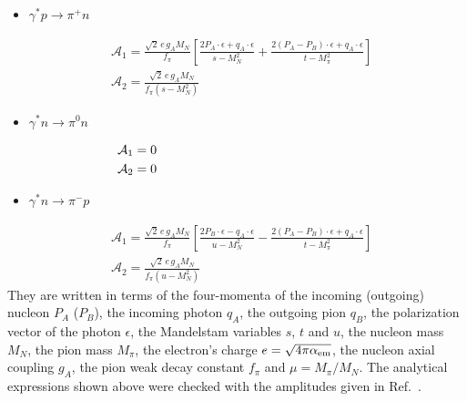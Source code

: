 \documentclass[twocolumn,prc,showpacs,nofootinbib,preprintnumbers,amsmath,amssymb,superscriptaddress]{revtex4-1}
\begin{document}
\begin{itemize}
 \item $\gamma^* p \to \pi^+ n$
\end{itemize}
\begin{align}
  &\mathcal{A}_1= \frac{\sqrt{2}\, e\, g_A M_N}{f_\pi}\left[\frac{2 P_A\cdot \epsilon + q_A\cdot \epsilon}{s-M_N^2} + \frac{2 (P_A - P_B)\cdot \epsilon + q_A\cdot \epsilon}{t-M_\pi^2}\right]\\
   &\mathcal{A}_2=\frac{\sqrt{2}\, e\, g_A M_N}{f_\pi(s-M_N^2)}
\end{align}


\begin{itemize}
 \item $\gamma^* n \to \pi^0 n$
\end{itemize}
\begin{align}
  &\mathcal{A}_1= 0\hspace{5.5cm}\\
   &\mathcal{A}_2=0
\end{align}


\begin{itemize}
 \item $\gamma^* n \to \pi^- p$
\end{itemize}
\begin{align}
  &\mathcal{A}_1= \frac{\sqrt{2}\, e\, g_A M_N}{f_\pi}\left[\frac{2 P_B\cdot \epsilon - q_A\cdot \epsilon}{u-M_N^2}  - \frac{2 (P_A - P_B)\cdot \epsilon + q_A\cdot \epsilon}{t-M_\pi^2}\right]\\
   &\mathcal{A}_2=\frac{\sqrt{2}\, e\, g_A M_N}{f_\pi(u-M_N^2)}
\end{align}
They are written in terms of the four-momenta of the incoming (outgoing) nucleon $P_A$ ($P_B$), the incoming photon $q_A$, the outgoing pion $q_B$, the polarization vector of the photon $\epsilon$, the Mandelstam variables $s$, $t$ and $u$, the nucleon mass $M_N$, the pion mass $M_\pi$, the electron's charge $e=\sqrt{4\pi \alpha_{\rm em}}$, the nucleon axial coupling $g_A$, the pion weak decay constant $f_\pi$ and $\mu=M_\pi/M_N$. 
The analytical expressions shown above were checked with the amplitudes given in Ref.~\cite{Pasquini:2007fw}.
\end{document}
